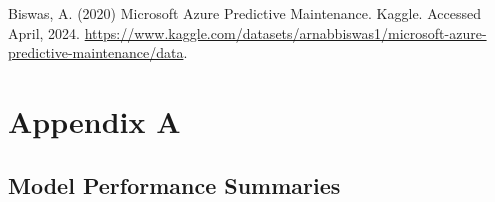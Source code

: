 \documentclass{article}
\begin{document}
\begin{thebibliography}{99}

\small

Biswas, A. (2020) Microsoft Azure Predictive Maintenance. Kaggle. Accessed April, 2024. \url{https://www.kaggle.com/datasets/arnabbiswas1/microsoft-azure-predictive-maintenance/data}.

\end{thebibliography}

\newpage 

\appendix

\section{Appendix A}

\subsection{Model Performance Summaries}
\label{app:app1}
\end{document}
